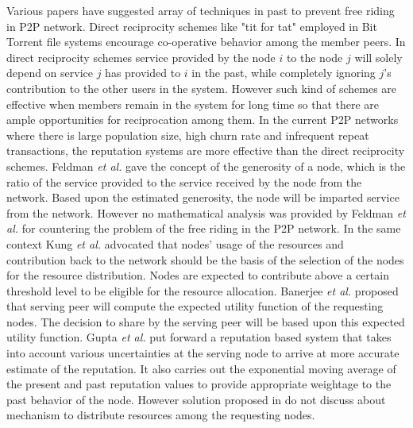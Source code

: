 \documentclass[journal]{IEEEtran}
\begin{document}
Various papers have suggested array of techniques in past to prevent free riding in P2P network. Direct reciprocity schemes like "tit for tat" \cite{tit_for_tat} employed in Bit Torrent file systems \cite{Cohen} encourage co-operative behavior among the member peers. In direct reciprocity schemes service provided by the node $i$ to the node $j$ will solely depend on service $j$ has provided to $i$ in the past, while completely ignoring $j$'s contribution to the other users in the system. However such kind of schemes  are effective when members remain in the system for long time so that there are ample opportunities for reciprocation among them. In the current P2P networks where there is large population size, high churn rate \cite{Stutzbach} and infrequent repeat transactions, the reputation systems are more effective than the direct reciprocity schemes. Feldman \emph{et al.} \cite{Feldman} gave the concept of the generosity of a node, which is the ratio of the service provided to the service received by the node from the network. Based upon the estimated generosity, the node will be imparted service from the network. However no mathematical analysis was provided by Feldman \emph{et al.} for countering the problem of the free riding in the P2P network. In the same context Kung \emph{et al.} \cite{Kung} advocated that nodes' usage of the resources and contribution back to the network should be the basis of the selection of the nodes for the resource distribution. Nodes are expected to contribute above a certain threshold level to be eligible for the resource allocation. Banerjee \emph{et al.} \cite{Banerjee} proposed that serving peer will compute the expected utility function of the requesting nodes. The decision to share by the serving peer will be based upon this expected utility function. Gupta \emph{et al.} \cite{TrustEstimation} put forward a reputation based system that takes into account various uncertainties at the serving node to arrive at more accurate estimate of the reputation. It also carries out the exponential moving average of the present and past reputation values to provide appropriate weightage to the past behavior of the node. However solution proposed in \cite{Feldman}\cite{Kung}\cite{Banerjee}\cite{TrustEstimation} do not discuss about mechanism to distribute resources among the requesting nodes. 
\end{document}
